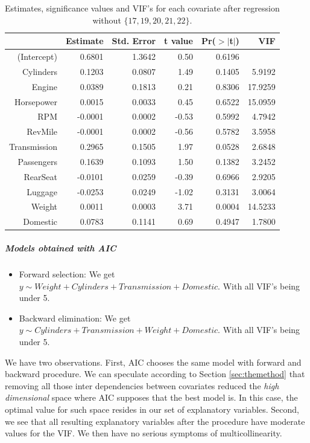 \documentclass[12pt]{article}
\begin{document}
\begin{table}[h!]
\centering
\caption{Estimates, significance values and VIF's for each covariate after regression without $\{17,19,20,21,22\}$.}
\label{tab:individual2}
\begin{tabular}{|rrrrrr|}
  \hline
 & Estimate & Std. Error & t value & Pr($>$$|$t$|$) & VIF \\ 
  \hline
(Intercept) & 0.6801 & 1.3642 & 0.50 & 0.6196 &\\ 
  Cylinders & 0.1203 & 0.0807 & 1.49 & 0.1405 & 5.9192\\ 
  Engine & 0.0389 & 0.1813 & 0.21 & 0.8306 & 17.9259\\ 
  Horsepower & 0.0015 & 0.0033 & 0.45 & 0.6522 & 15.0959\\ 
  RPM & -0.0001 & 0.0002 & -0.53 & 0.5992 & 4.7942\\ 
  RevMile & -0.0001 & 0.0002 & -0.56 & 0.5782 & 3.5958\\ 
  Transmission & 0.2965 & 0.1505 & 1.97 & 0.0528 &  2.6848\\ 
  Passengers & 0.1639 & 0.1093 & 1.50 & 0.1382 & 3.2452\\ 
  RearSeat & -0.0101 & 0.0259 & -0.39 & 0.6966 & 2.9205\\ 
  Luggage & -0.0253 & 0.0249 & -1.02 & 0.3131 & 3.0064\\ 
  Weight & 0.0011 & 0.0003 & 3.71 & 0.0004 & 14.5233\\ 
  Domestic & 0.0783 & 0.1141 & 0.69 & 0.4947 & 1.7800\\ 
   \hline
\end{tabular}
\end{table}

\subparagraph{Models obtained with AIC}
\begin{itemize}
\item Forward selection: We get $y \sim Weight + Cylinders + Transmission + 
    Domestic$. With all VIF's being under 5.
\item Backward elimination: We get $y \sim Cylinders + Transmission + Weight + 
    Domestic$. With all VIF's being under 5.
\end{itemize}
We have two observations. First, AIC chooses the same model with forward and backward
procedure. We can speculate according to Section \ref{sec:themethod} that removing
all those inter dependencies between covariates reduced the \emph{high dimensional}
space where AIC supposes that the best model is. In this case, the optimal value for such space resides in our set of explanatory variables.
Second, we see that all resulting explanatory variables after the procedure have
moderate values for the VIF. We then have no serious symptoms of multicollinearity.
\end{document}
